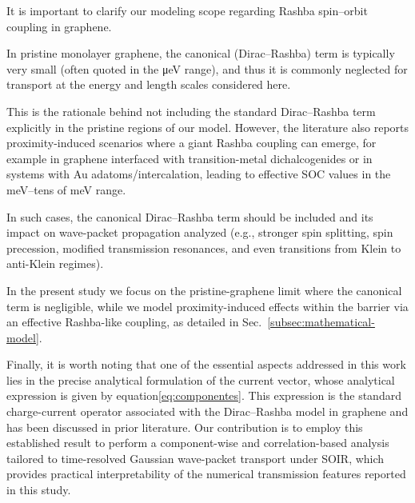 It is important to clarify our modeling scope regarding Rashba spin–orbit coupling in graphene.

In pristine monolayer graphene, the canonical (Dirac–Rashba) term is typically very small (often quoted in the μeV range), and thus it is commonly neglected for transport at the energy and length scales considered here.

This is the rationale behind not including the standard Dirac–Rashba term explicitly in the pristine regions of our model.
However, the literature also reports proximity-induced scenarios where a giant Rashba coupling can emerge, for example in graphene interfaced with transition-metal dichalcogenides or in systems with Au adatoms/intercalation, leading to effective SOC values in the meV–tens of meV range\cite{AvsarNatCommun2014, WangPhysRevX2016}.

In such cases, the canonical Dirac–Rashba term should be included and its impact on wave-packet propagation analyzed (e.g., stronger spin splitting, spin precession, modified transmission resonances, and even transitions from Klein to anti-Klein regimes).

In the present study we focus on the pristine-graphene limit where the canonical term is negligible, while we model proximity-induced effects within the barrier via an effective Rashba-like coupling, as detailed in Sec.~\ref{subsec:mathematical-model}.


Finally, it is worth noting that one of the essential aspects addressed in this work lies in the precise analytical formulation of the current vector, whose analytical expression is given by equation\eqref{eq:componentes}.
This expression is the standard charge-current operator associated with the Dirac–Rashba model in graphene and has been discussed in prior literature\cite{AvishaiPhysRevB2021}.
Our contribution is to employ this established result to perform a component-wise and correlation-based analysis tailored to time-resolved Gaussian wave-packet transport under SOIR, which provides practical interpretability of the numerical transmission features reported in this study.


%

